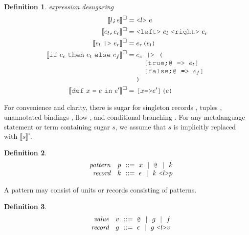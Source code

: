 \documentclass[acmsmall]{acmart}
\theoremstyle{definition}
\newtheorem{definition}{Definition}[section]
\begin{document}
\begin{definition} 
  \label{def:expression_desugaring}
  \emph{expression desugaring}
  \hfill 
  \small
  \\
  \begin{align*}
      \llbracket l \J{;} e \rrbracket^\square &= \J{<}l \J{>}\ e
      \\
      \llbracket e_l \J{,} e_r \rrbracket^\square &= \J{<left>}\ e_l \ \J{<right>}\ e_r
      \\
      \llbracket e_l\ \J{|>}\ e_r \rrbracket^\square &= e_r\J{(}e_l\J{)}
      \\
      \llbracket \J{if}\ e_c\ \J{then}\ e_t\ \J{else}\ e_f \rrbracket^\square &= 
      \begin{array}[t]{@{} l}
        e_c \J{ |> (}
          \\
          \I \J{[true;@ => } e_t \J{]}
          \\
          \I \J{[false;@ => } e_f \J{]}
          \\
        \J{)}
      \end{array}
      \\
      \llbracket \J{def}\ x\ \J{=}\ e\ \J{in}\ e' \rrbracket^\square &= \J{[}x \J{=>} e'\J{]}\J{(}e\J{)}
  \end{align*}

\end{definition} 

\noindent
For convenience and clarity, there is sugar for 
singleton records ,
tuples , 
unannotated bindings , flow ,
and conditional branching .
For any metalanguage statement or term containing sugar $s$, we assume that $s$ is implicitly replaced with $\llbracket s \rrbracket^\square$.

\begin{definition}
  \label{def:pattern}
  \[\begin{array}[t]{rr@{}l}
    \com{pattern} &
    \nonterm{p} & \is 
      x \sep
      \J{@} \sep
      k
    \\
    \com{record} &
    \nonterm{k} & \is \epsilon \sep k\ \J{<}l\J{>}p
  \end{array}\]
\end{definition}

\noindent
A pattern may consist of units or records consisting of patterns.

\begin{definition}
  \label{def:value}
  \[\begin{array}[t]{rr@{}l}
    \com{value} &
    \nonterm{v} & \is 
      \J{@} \sep
      g \sep
      f
    \\
    \com{record} &
    \nonterm{g} & \is \epsilon \sep g\ \J{<}l\J{>}v
  \end{array}\]
\end{definition}
\end{document}
